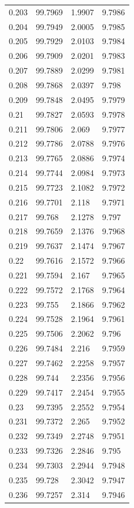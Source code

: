 \begin{tabular}{llll}
0.203 & 99.7969 & 1.9907 & 9.7986 \\
0.204 & 99.7949 & 2.0005 & 9.7985 \\
0.205 & 99.7929 & 2.0103 & 9.7984 \\
0.206 & 99.7909 & 2.0201 & 9.7983 \\
0.207 & 99.7889 & 2.0299 & 9.7981 \\
0.208 & 99.7868 & 2.0397 & 9.798 \\
0.209 & 99.7848 & 2.0495 & 9.7979 \\
0.21 & 99.7827 & 2.0593 & 9.7978 \\
0.211 & 99.7806 & 2.069 & 9.7977 \\
0.212 & 99.7786 & 2.0788 & 9.7976 \\
0.213 & 99.7765 & 2.0886 & 9.7974 \\
0.214 & 99.7744 & 2.0984 & 9.7973 \\
0.215 & 99.7723 & 2.1082 & 9.7972 \\
0.216 & 99.7701 & 2.118 & 9.7971 \\
0.217 & 99.768 & 2.1278 & 9.797 \\
0.218 & 99.7659 & 2.1376 & 9.7968 \\
0.219 & 99.7637 & 2.1474 & 9.7967 \\
0.22 & 99.7616 & 2.1572 & 9.7966 \\
0.221 & 99.7594 & 2.167 & 9.7965 \\
0.222 & 99.7572 & 2.1768 & 9.7964 \\
0.223 & 99.755 & 2.1866 & 9.7962 \\
0.224 & 99.7528 & 2.1964 & 9.7961 \\
0.225 & 99.7506 & 2.2062 & 9.796 \\
0.226 & 99.7484 & 2.216 & 9.7959 \\
0.227 & 99.7462 & 2.2258 & 9.7957 \\
0.228 & 99.744 & 2.2356 & 9.7956 \\
0.229 & 99.7417 & 2.2454 & 9.7955 \\
0.23 & 99.7395 & 2.2552 & 9.7954 \\
0.231 & 99.7372 & 2.265 & 9.7952 \\
0.232 & 99.7349 & 2.2748 & 9.7951 \\
0.233 & 99.7326 & 2.2846 & 9.795 \\
0.234 & 99.7303 & 2.2944 & 9.7948 \\
0.235 & 99.728 & 2.3042 & 9.7947 \\
0.236 & 99.7257 & 2.314 & 9.7946 \\

\end{tabular}
